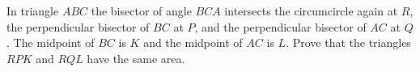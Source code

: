 In triangle $ ABC$ the bisector of angle $ BCA$ intersects the circumcircle again at $ R$,  the perpendicular bisector of $ BC$ at $ P$,  and the perpendicular bisector of $ AC$ at $ Q$. The midpoint of $ BC$ is $ K$ and the midpoint of $ AC$ is $ L$. Prove that the triangles $ RPK$ and $ RQL$ have the same area.